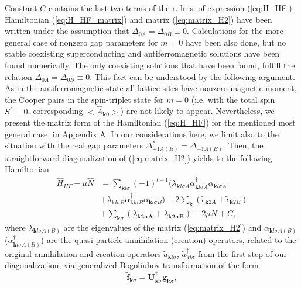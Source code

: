 \documentclass[aps,prb,showpacs,reprint]{revtex4-1}
\begin{document}
Constant $C$ contains the last two terms of the r. h. s. of expression
(\ref{eq:H_HF}).
Hamiltonian (\ref{eq:H_HF_matrix}) and matrix (\ref{eq:matrix_H2}) have been
written under the assumption that $\Delta_{0
A}=\Delta_{0 B}\equiv 0$. Calculations for the more general case of nonzero gap
parameters for $m=0$ have been also done, but no stable coexisting
superconducting and
antiferromagnetic solutions have been found numerically. The only
coexisting solutions that have been found, fulfill the relation $\Delta_{0
A}=\Delta_{0 B}\equiv 0$. This fact can be understood by the following argument.
As in the antiferromagnetic state all lattice sites have nonzero magnetic
moment, the Cooper pairs in the spin-triplet state for $m=0$ (i.e. with the
total
spin
$S^z=0$, corresponding $<\hat{A}_{\mathbf{k}0}>$) are not
likely to appear. Nevertheless, we present the matrix form of the Hamiltonian
(\ref{eq:H_HF}) for the mentioned most general case, in Appendix A.
In our considerations here, we limit also to the situation with the real gap parameters
$\Delta_{\pm1A(B) }^*=\Delta_{\pm 1A(B)}$.
Then, the straightforward diagonalization of (\ref{eq:matrix_H2}) yields to the following Hamiltonian
\begin{equation}
\begin{split}
\hat{H}_{HF}-\mu\hat{N}&=\sum_{\mathbf{k}l\sigma}(-1)^{l+1}(\lambda_
{\mathbf{k}l\sigma A}
\alpha^{\dagger}_{\mathbf{k}l\sigma A}\alpha_{\mathbf{k}l\sigma A}\\
&+\lambda_
{\mathbf{k}l\sigma B}
\alpha^{\dagger}_{\mathbf{k}l\sigma B}\alpha_{\mathbf{k}l\sigma B})
+2\sum_{\mathbf{k}}(\tilde{\epsilon}_{\mathbf{k}2
A}+\tilde{\epsilon}_{\mathbf{k}2 B}
)\\
&+\sum_{\mathbf{k}\sigma}(\lambda_{\mathbf{k2\sigma
A}}+\lambda_{\mathbf{k2\sigma B}})-2\mu N+C,
\end{split}
\end{equation}
where $\lambda_{\mathbf{k}l\sigma A(B)}$ are the eigenvalues of the matrix
(\ref{eq:matrix_H2}) and $\alpha_{\mathbf{k}l\sigma
A(B)}$ ($\alpha^{\dagger}_{\mathbf{k}l\sigma A(B)}$) are the
quasi-particle annihilation (creation) operators, related to the
original annihilation and creation operators $\tilde{a}_{\mathbf{k}l\sigma}$,
$\tilde{a}^{\dagger}_{\mathbf{k}l\sigma}$ from the first step of our
diagonalization, via generalized Bogoliubov transformation of the form
\begin{equation}
\mathbf{\tilde{f}}_{\mathbf{k}\sigma}=\mathbf{U}^{\dagger}_{\mathbf{k}\sigma
}\mathbf{g}_{\mathbf{k}\sigma},
\end{equation}
\end{document}
